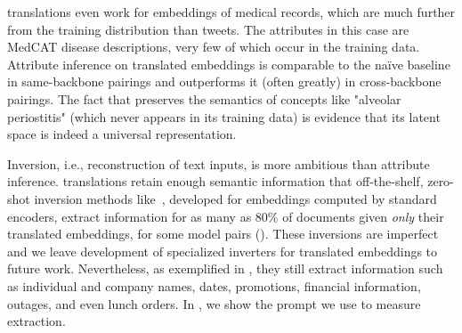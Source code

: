 \label{sec:mimic_classification}
\atk{} translations even work for embeddings of medical records, which are much further from the training distribution than tweets.  The attributes in this case are MedCAT disease descriptions, very few of which occur in the training data.  Attribute inference on translated embeddings is comparable to the naïve baseline in same-backbone pairings and outperforms it (often greatly) in cross-backbone pairings.  The fact that \atk{} preserves the semantics of concepts like "alveolar periostitis" (which never appears in its training data) is evidence that its latent space is indeed a universal representation.




Inversion, i.e., reconstruction of text inputs, is more ambitious than attribute inference.  \atk{} translations retain enough semantic information that off-the-shelf, zero-shot inversion methods like~\cite{zhang2025universalzeroshotembeddinginversion}, developed for embeddings computed by standard encoders, extract information for as many as 80\% of documents given \emph{only} their translated embeddings, for some model pairs ().  These inversions are imperfect and we leave development of specialized inverters for translated embeddings to future work.  Nevertheless, as exemplified in , they still extract information such as individual and company names, dates, promotions, financial information, outages, and even lunch orders. In , we show the prompt we use to measure extraction.

